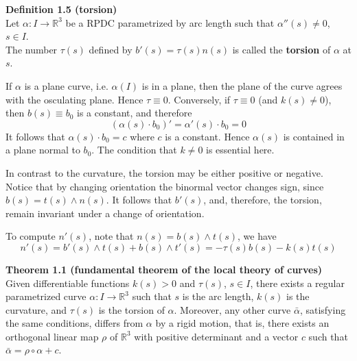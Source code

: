 \documentclass{article}
\begin{document}
\par
\textbf{Definition 1.5 (torsion)}\\
Let $\alpha: I \to \mathbb R^3$ be a RPDC parametrized by arc length such that $\alpha''(s) \neq 0$, $s \in I$.\\
The number $\tau(s)$ defined by $b'(s) = \tau (s)n(s)$ is called the \textbf{torsion} of $\alpha$ at $s$.

\par
If $\alpha$ is a plane curve, i.e. $\alpha(I)$ is in a plane, then the plane of the curve agrees with the 
osculating plane. Hence $\tau \equiv 0$. Conversely, if $\tau \equiv 0$ (and $k(s) \neq 0$), then $b(s) \equiv b_0$
is a constant, and therefore
$$
(\alpha (s) \cdot b_0)' = \alpha '(s) \cdot b_0 = 0
$$
It follows that $\alpha(s) \cdot b_0 = c$ where $c$ is a constant. Hence $\alpha(s)$ is contained in a plane normal
to $b_0$. The condition that $k \neq 0$ is essential here.

\par
In contrast to the curvature, the torsion may be either positive or negative. Notice that by changing orientation
the binormal vector changes sign, since $b(s) = t(s) \land n(s)$. It follows that $b'(s)$, and, therefore, the
torsion, remain invariant under a change of orientation.

\par
To compute $n'(s)$, note that $n(s) = b(s) \land t(s)$, we have
$$
    n'(s) = b'(s) \land t(s) + b(s) \land t'(s) = -\tau (s)b(s) -k(s)t(s)
$$

\par
\textbf{Theorem 1.1 (fundamental theorem of the local theory of curves)}\\
Given differentiable functions $k(s)>0$ and $\tau (s)$, $s \in I$, there exists a regular parametrized curve
$\alpha:I \to \mathbb R^3$ such that $s$ is the arc length, $k(s)$ is the curvature, and $\tau (s)$ is the torsion
of $\alpha$. Moreover, any other curve $\bar{\alpha}$, satisfying the same conditions, differs from $\alpha$ by a
rigid motion, that is, there exists an orthogonal linear map $\rho$ of $\mathbb R^3$ with positive determinant
and a vector $c$ such that $\bar{\alpha} = \rho \circ \alpha + c$.
\end{document}
